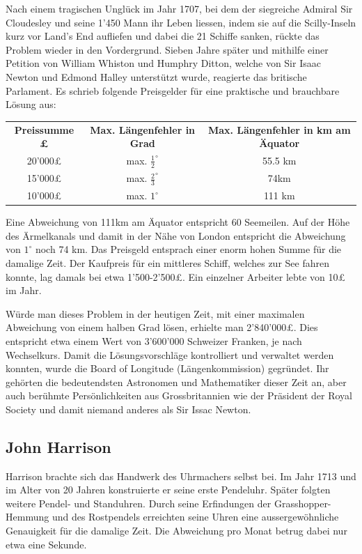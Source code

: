 \begin{refsection}
Nach einem tragischen Unglück im Jahr 1707, bei dem der siegreiche Admiral Sir Cloudesley und seine 1’450 Mann ihr Leben liessen, indem sie auf die Scilly-Inseln kurz vor Land’s End aufliefen und dabei die 21 Schiffe sanken, rückte das Problem wieder in den Vordergrund.
Sieben Jahre später und mithilfe einer Petition von William Whiston und Humphry Ditton, welche von Sir Isaac Newton und Edmond Halley unterstützt wurde, reagierte das britische Parlament.
Es schrieb folgende Preisgelder für eine praktische und brauchbare Lösung aus:

\begin{center}
\renewcommand{\arraystretch}{2}
\begin{tabular}{ccc}
\textbf{Preissumme £} & \textbf{Max. Längenfehler in Grad} & \textbf{Max. Längenfehler in km am Äquator}  \\
20’000£ & max. $\frac{1}{2}^{\circ}$ & 55.5 km \\
15’000£ & max. $\frac{2}{3}^{\circ}$ & 74km \\
10’000£ & max. $1 ^{\circ}$ & 111 km 
\end{tabular}
\end{center}

Eine Abweichung von 111km am Äquator entspricht 60 Seemeilen.
Auf der Höhe des Ärmelkanals und damit in der Nähe von London entspricht die Abweichung von $1 ^{\circ}$ noch 74 km.
Das Preisgeld entsprach einer enorm hohen Summe für die damalige Zeit. Der Kaufpreis für ein mittleres Schiff, welches zur See fahren konnte, lag damals bei etwa 1’500-2’500£. Ein einzelner Arbeiter lebte von 10£ im Jahr.

Würde man dieses Problem in der heutigen Zeit, mit einer maximalen Abweichung von einem halben Grad lösen, erhielte man 2’840’000£. Dies entspricht etwa einem Wert von 3’600’000 Schweizer Franken, je nach Wechselkurs.
Damit die Lösungsvorschläge kontrolliert und verwaltet werden konnten, wurde die Board of Longitude (Längenkommission) gegründet. Ihr gehörten die bedeutendsten Astronomen und Mathematiker dieser Zeit an, aber auch berühmte Persönlichkeiten aus Grossbritannien wie der Präsident der Royal Society und damit niemand anderes als Sir Issac Newton.



\subsection{John Harrison}
Harrison brachte sich das Handwerk des Uhrmachers selbst bei. Im Jahr 1713 und im Alter von 20 Jahren konstruierte er seine erste Pendeluhr. Später folgten weitere Pendel- und Standuhren. Durch seine Erfindungen der Grasshopper-Hemmung und des Rostpendels erreichten seine Uhren eine aussergewöhnliche Genauigkeit für die damalige Zeit. Die Abweichung pro Monat betrug dabei nur etwa eine Sekunde.


\end{refsection}
